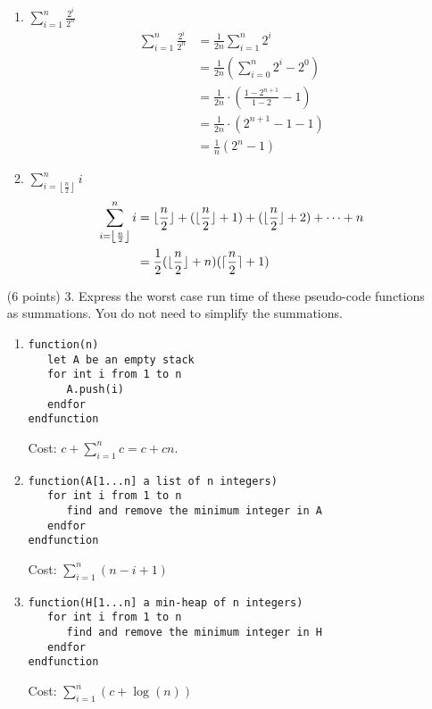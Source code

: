 \documentclass[paper=a4, fontsize=11pt]{scrartcl}
\DeclarePairedDelimiter\floor{\lfloor}{\rfloor}
\DeclarePairedDelimiter\ceil{\lceil}{\rceil}
\numberwithin{equation}{section}		%
\numberwithin{figure}{section}			%
\numberwithin{table}{section}				%
\begin{document}
\begin{enumerate}
\begin{enumerate}
\item
$\displaystyle\sum_{i=1}^{n}\frac{2^i}{2^n}$
\begin{align*}
	\sum_{i=1}^{n}\frac{2^i}{2^n} &= \frac{1}{2n}\sum_{i=1}^{n}2^i \\
	&= \frac{1}{2n}(\sum_{i=0}^{n}2^i-2^0) \\
	&= \frac{1}{2n} \cdot (\frac{1-2^{n+1}}{1-2} - 1) \\
	&= \frac{1}{2n} \cdot (2^{n+1} - 1 - 1) \\
	&= \frac{1}{n} (2^n - 1)
\end{align*}




\item
$\displaystyle\sum_{i=\left\lfloor\frac{n}{2}\right\rfloor}^{n}i$
\begin{align*}
	\sum_{i=\left\lfloor\frac{n}{2}\right\rfloor}^{n}i &= \floor{\frac{n}{2}} + (\floor{\frac{n}{2}} + 1) + (\floor{\frac{n}{2}} + 2) + \dots + n \\
	&= \frac{1}{2}(\floor{\frac{n}{2}}+n)(\ceil{\frac{n}{2}}+1)
\end{align*}
\end{enumerate}
\item [(6 points) 3.] Express the worst case run time of these pseudo-code functions as summations.  You do not need to simplify the summations.  
\begin{enumerate}
\item
\begin{verbatim}
function(n)
   let A be an empty stack
   for int i from 1 to n
      A.push(i)
   endfor
endfunction
\end{verbatim}

Cost: $\displaystyle c + \sum_{i=1}^{n}c  = c + cn$.


\item
\begin{verbatim}
function(A[1...n] a list of n integers)
   for int i from 1 to n
      find and remove the minimum integer in A
   endfor
endfunction
\end{verbatim}

Cost: $\displaystyle\sum_{i=1}^{n}(n -i + 1)$

\item
\begin{verbatim}
function(H[1...n] a min-heap of n integers)
   for int i from 1 to n
      find and remove the minimum integer in H
   endfor
endfunction
\end{verbatim}

Cost: $\displaystyle\sum_{i=1}^{n}(c+\log(n))$

\end{enumerate}


\end{enumerate}
\end{document}
